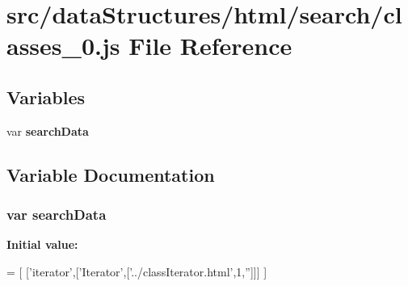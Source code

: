 \section{src/data\-Structures/html/search/classes\-\_\-0.js File Reference}
\label{html_2search_2classes__0_8js}
\subsection*{Variables}
\begin{DoxyCompactItemize}
\item 
var {\bf search\-Data}
\end{DoxyCompactItemize}


\subsection{Variable Documentation}
\subsubsection[{search\-Data}]{\setlength{\rightskip}{0pt plus 5cm}var search\-Data}\label{html_2search_2classes__0_8js_ad01a7523f103d6242ef9b0451861231e}
{\bfseries Initial value\-:}
\begin{DoxyCode}
=
[
  [\textcolor{stringliteral}{'iterator'},[\textcolor{stringliteral}{'Iterator'},[\textcolor{stringliteral}{'../classIterator.html'},1,\textcolor{stringliteral}{''}]]]
]
\end{DoxyCode}
